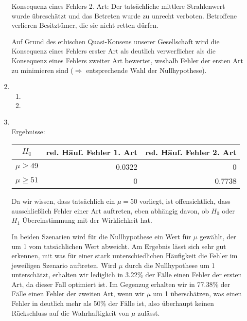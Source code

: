 \documentclass[a4paper]{scrartcl}
\def \blattnr {9}
\begin{document}
\begin{enumerate}[label=\bfseries \blattnr.\arabic*]
      Konsequenz eines Fehlers 2. Art: Der tatsächliche mittlere Strahlenwert wurde übreschätzt und das Betreten wurde zu unrecht 
      verboten. Betroffene verlieren Besitztümer, die sie nicht retten dürfen. 
      
      Auf Grund des ethischen Quasi-Konsens unserer Gesellschaft wird die Konsequenz eines Fehlers erster Art als deutlich verwerflicher 
      als die Konsequenz eines Fehlers zweiter Art bewertet, weshalb Fehler der ersten Art zu minimieren sind ($\Rightarrow$ entsprechende 
      Wahl der Nullhypothese).
    
    \item 
      \begin{enumerate}
       \item 
       \item 
      \end{enumerate}

    \pagebreak
    \item \hfill \\ 
      
      
      \pagebreak
      Ergebnisse:
      
      \begin{tabular}{c|r|r}
       $H_0$ & rel. Häuf. Fehler 1. Art & rel. Häuf. Fehler 2. Art \\
       \hline
       $\mu \geq 49$ & 0.0322 & 0 \\
       $\mu \geq 51$ & 0 & 0.7738
      \end{tabular}
      
      Da wir wissen, dass tatsächlich ein $\mu=50$ vorliegt, ist offensichtlich, 
      dass ausschließlich Fehler einer Art auftreten, eben abhängig davon, ob $H_0$ 
      oder $H_1$ Übereinstimmung mit der Wirklichkeit hat.
      
      In beiden Szenarien wird für die Nullhypothese ein Wert für $\mu$ gewählt, der 
      um 1 vom tatsächlichen Wert abweicht. Am Ergebnis lässt sich sehr gut erkennen,
      mit was für einer stark unterschiedlichen Häufigkeit die Fehler im jeweiligen 
      Szenario auftreten. Wird $\mu$ durch die Nullhypothese um 1 unterschätzt, 
      erhalten wir lediglich in 3.22\% der Fälle einen Fehler der ersten Art, 
      da dieser Fall optimiert ist. Im Gegenzug erhalten wir in 77.38\% der Fälle 
      einen Fehler der zweiten Art, wenn wir $\mu$ um 1 überschätzen, was einen 
      Fehler in deutlich mehr als 50\% der Fälle ist, also überhaupt keinen Rückschluss auf 
      die Wahrhaftigkeit von $\mu$ zulässt.

\end{enumerate}
\end{document}
